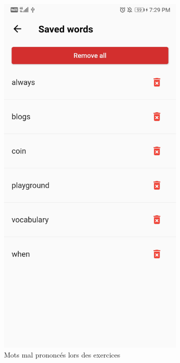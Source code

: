 \begin{appendices}
\begin{landscape}
\begin{figure}[h]
\begin{subfigure}{.25\textwidth}
    \includegraphics[width=.75\linewidth]{content/imgs/screen10.jpg}
    \caption{Mots mal prononcés lors des exercices}
    \label{appendix:screen_words}
  \end{subfigure}%
  \begin{subfigure}{.25\textwidth}
    \centering

\end{subfigure}
\end{figure}
\end{landscape}
\end{appendices}
